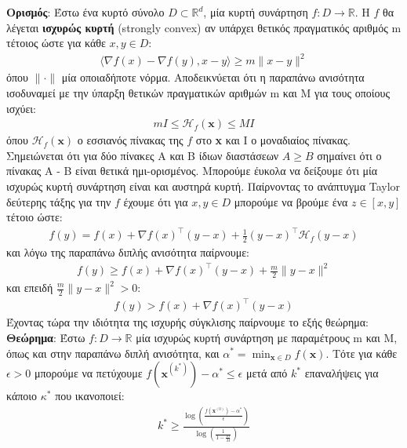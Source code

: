 \documentclass[11pt]{article} %
\numberwithin{equation}{subsection}
\begin{document}
\textbf{Ορισμός}: Έστω ένα κυρτό σύνολο $D \subset \mathbb{R}^d$, μία κυρτή συνάρτηση $f : D \rightarrow \mathbb{R}$. Η $f$ θα λέγεται \textbf{ισχυρώς κυρτή} (strongly convex) αν υπάρχει θετικός πραγματικός αριθμός m τέτοιος ώστε για κάθε $x,y \in D$:
\begin{align*}
\langle \nabla f(x) - \nabla f(y), x - y \rangle \geq m \parallel x - y \parallel ^ 2
\end{align*}
όπου $\parallel \cdot \parallel$ μία οποιαδήποτε νόρμα. Αποδεικνύεται ότι η παραπάνω ανισότητα ισοδυναμεί με την ύπαρξη θετικών πραγματικών αριθμών m και M για τους οποίους ισχύει:
\begin{align*}
mI \leq \mathcal{H}_f (\textbf{x}) \leq MI
\end{align*}
όπου $\mathcal{H}_f (\textbf{x})$ ο εσσιανός πίνακας της $f$ στο \textbf{x} και I ο μοναδιαίος πίνακας. Σημειώνεται ότι για δύο πίνακες A και B ίδιων διαστάσεων $A \geq B$ σημαίνει ότι ο πίνακας Α - B είναι θετικά ημι-ορισμένος.  Μπορούμε έυκολα να δείξουμε ότι μία ισχυρώς κυρτή συνάρτηση είναι και αυστηρά κυρτή. Παίρνοντας το ανάπτυγμα Taylor δεύτερης τάξης για την $f$ έχουμε ότι για $x,y \in D$ μπορούμε να βρούμε ένα $z \in [x, y]$ τέτοιο ώστε:
\begin{align*}
f(y) = f(x) + \nabla f(x) ^ \intercal (y - x) + \frac{1}{2} (y - x) ^ \intercal \mathcal{H}_f (y - x)
\end{align*}
και λόγω της παραπάνω διπλής ανισότητα παίρνουμε:
\begin{align*}
f(y) \geq f(x) + \nabla f(x) ^ \intercal (y - x) + \frac{m}{2} \parallel y - x \parallel ^ 2
\end{align*}
και επειδή $\frac{m}{2} \parallel y - x \parallel ^ 2 > 0$:
\begin{align*}
f(y) > f(x) + \nabla f(x) ^ \intercal (y - x)
\end{align*}
Έχοντας τώρα την ιδιότητα της ισχυρής σύγκλισης παίρνουμε το εξής θεώρημα:\\

\textbf{Θεώρημα}: Έστω $ f : D \rightarrow \mathbb{R}$ μία ισχυρώς κυρτή συνάρτηση με παραμέτρους m και Μ, όπως και στην παραπάνω διπλή ανισότητα, και $\alpha^* = \min_{\textbf{x} \in D} f(\textbf{x})$. Τότε για κάθε $\epsilon > 0$ μπορούμε να πετύχουμε $f(\textbf{x}^{(k^*)}) - \alpha^* \leq \epsilon$ μετά από $k^*$ επαναλήψεις για κάποιο $κ^*$ που ικανοποιεί:
\begin{align*}
k^* \geq \frac{\log \left( \frac{f(\textbf{x}^{(0)}) - \alpha^*}{\epsilon}\right)}{\log \left( \frac{1}{1 - \frac{m}{M}} \right)}
\end{align*}
\end{document}
